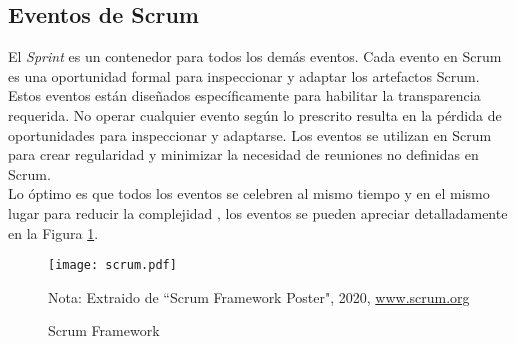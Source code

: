 \begin{spacing}{1.5}
	\subsection{Eventos de Scrum}
		El \textit{Sprint} es un contenedor para todos los demás eventos. Cada evento en Scrum es una oportunidad formal para inspeccionar y adaptar los artefactos Scrum. Estos eventos están diseñados específicamente para habilitar la transparencia requerida. No operar cualquier evento según lo prescrito resulta en la pérdida de oportunidades para inspeccionar y adaptarse. Los eventos se utilizan en Scrum para crear regularidad y minimizar la necesidad de reuniones no definidas en Scrum.\\
		Lo óptimo es que todos los eventos se celebren al mismo tiempo y en el mismo lugar para reducir la complejidad \cite{chap2_scrum}, los eventos se pueden apreciar detalladamente en la Figura \ref{figure:chaperII_1}.
		\begin{figure}[H]
			\texttt{[image: scrum.pdf]}
			\caption {\centering \small{Scrum Framework}} \label{figure:chaperII_1}
			\centering \small {Nota: Extraido de ``Scrum Framework Poster", 2020, \url{www.scrum.org}}
		\end{figure}

\end{spacing}
